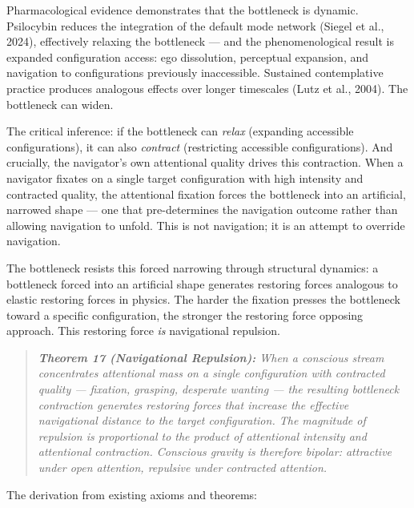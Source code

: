 Pharmacological evidence demonstrates that the bottleneck is dynamic. Psilocybin reduces the integration of the default mode network (Siegel et al., 2024), effectively relaxing the bottleneck — and the phenomenological result is expanded configuration access: ego dissolution, perceptual expansion, and navigation to configurations previously inaccessible. Sustained contemplative practice produces analogous effects over longer timescales (Lutz et al., 2004). The bottleneck can widen.


The critical inference: if the bottleneck can \textit{relax} (expanding accessible configurations), it can also \textit{contract} (restricting accessible configurations). And crucially, the navigator's own attentional quality drives this contraction. When a navigator fixates on a single target configuration with high intensity and contracted quality, the attentional fixation forces the bottleneck into an artificial, narrowed shape — one that pre-determines the navigation outcome rather than allowing navigation to unfold. This is not navigation; it is an attempt to override navigation.


The bottleneck resists this forced narrowing through structural dynamics: a bottleneck forced into an artificial shape generates restoring forces analogous to elastic restoring forces in physics. The harder the fixation presses the bottleneck toward a specific configuration, the stronger the restoring force opposing approach. This restoring force \textit{is} navigational repulsion.


\begin{quote}
\itshape
\textbf{Theorem 17 (Navigational Repulsion):} \textit{When a conscious stream concentrates attentional mass on a single configuration with contracted quality — fixation, grasping, desperate wanting — the resulting bottleneck contraction generates restoring forces that increase the effective navigational distance to the target configuration. The magnitude of repulsion is proportional to the product of attentional intensity and attentional contraction. Conscious gravity is therefore bipolar: attractive under open attention, repulsive under contracted attention.}
\end{quote}


The derivation from existing axioms and theorems:



